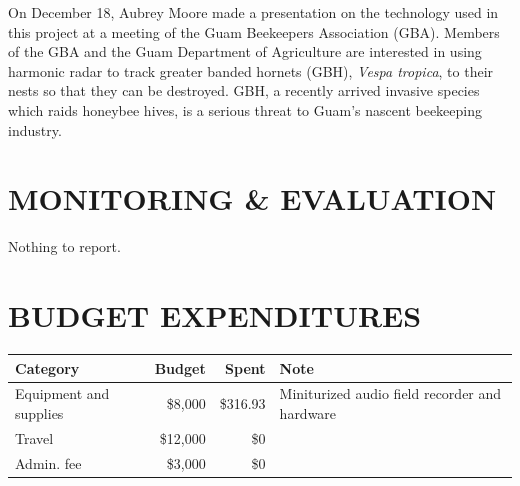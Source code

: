 \documentclass[12pt,letterpaper,english,bibliography=totocnumbered,abstract=on]{scrartcl}
\begin{document}
%
%
%
%
%
%

On December 18, Aubrey Moore made a presentation on the technology used in this project at a meeting of the Guam Beekeepers Association (GBA). Members of the GBA and the Guam Department of Agriculture are interested in using harmonic radar to track greater banded hornets (GBH), \textit{Vespa tropica}, to their nests so that they can be destroyed. GBH, a recently arrived invasive species which raids honeybee hives, is a serious threat to Guam's nascent beekeeping industry.

\section{MONITORING \& EVALUATION}

%

Nothing to report.

\section{BUDGET EXPENDITURES}


\begin{tabular}{lrrl}
	\hline
	Category & Budget & Spent & Note \\
	\hline 
	Equipment and supplies & \$8,000 & \$316.93 & Miniturized audio field recorder and hardware \\ 
	Travel & \$12,000 & \$0 \\ 
	Admin. fee & \$3,000 & \$0 \\ 
	\hline 
\end{tabular} 
\end{document}
